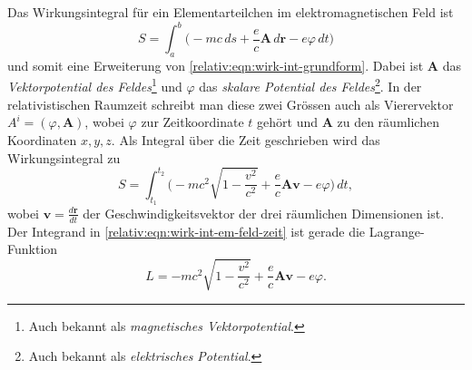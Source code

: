 Das Wirkungsintegral für ein Elementarteilchen im elektromagnetischen Feld ist
%
\begin{equation}
    S = \int_a^b \biggl(-mc\,ds + \frac{e}{c} \bm{A}\,d\bm{r} - e\varphi\,dt\biggr)
    \label{relativ:eqn:wirk-int-em-feld}
\end{equation}
und somit eine Erweiterung von \eqref{relativ:eqn:wirk-int-grundform}.
Dabei ist \(\bm{A}\) das \emph{Vektorpotential des Feldes}\footnote{
    Auch bekannt als \emph{magnetisches Vektorpotential}.}
%
und \(\varphi\) das \emph{skalare Potential des Feldes}\footnote{
    Auch bekannt als \emph{elektrisches Potential}.}.
%
In der relativistischen Raumzeit schreibt man diese zwei Grössen
auch als Vierervektor \(A^i = (\varphi, \bm{A})\),
wobei \(\varphi\) zur Zeitkoordinate \(t\) gehört und
\(\bm{A}\) zu den räumlichen Koordinaten \(x, y, z\).
Als Integral über die Zeit geschrieben wird das Wirkungsintegral zu
\begin{equation}
    S = \int_{t_1}^{t_2} \biggl( -mc^2 \sqrt{1-\frac{v^2}{c^2}} + \frac{e}{c} \bm{A} \bm{v} - e \varphi \biggr) \, dt,
    \label{relativ:eqn:wirk-int-em-feld-zeit}
\end{equation}
wobei \(\displaystyle \bm{v} = \frac{d\bm{r}}{dt}\) der Geschwindigkeitsvektor der drei räumlichen Dimensionen ist.
Der Integrand in \eqref{relativ:eqn:wirk-int-em-feld-zeit} ist gerade die Lagrange-Funktion
\begin{equation}
    L = -mc^2 \sqrt{1-\frac{v^2}{c^2}} + \frac{e}{c} \bm{A} \bm{v} - e \varphi.
    \label{relativ:eqn:lagrange-em-feld}
\end{equation}
